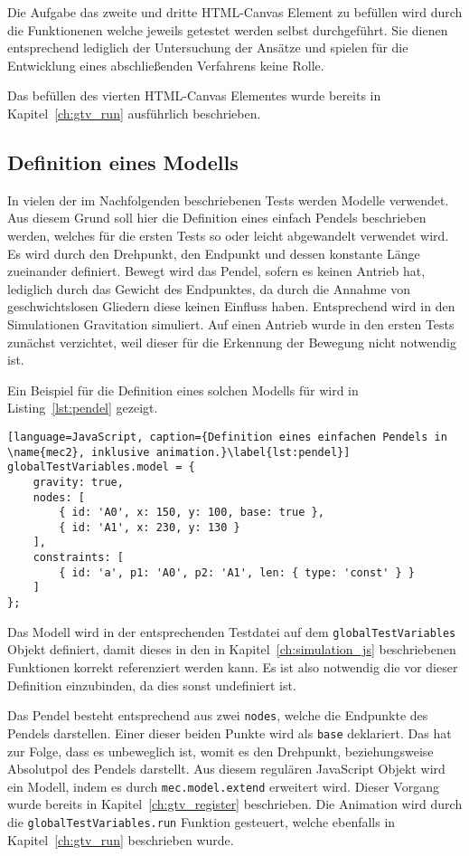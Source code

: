 Die Aufgabe das zweite und dritte HTML-Canvas Element zu befüllen wird durch die Funktionenen welche jeweils getestet werden selbst durchgeführt.
Sie dienen entsprechend lediglich der Untersuchung der Ansätze und spielen für die Entwicklung eines abschließenden Verfahrens keine Rolle.

Das befüllen des vierten HTML-Canvas Elementes wurde bereits in Kapitel~\ref{ch:gtv_run} ausführlich beschrieben.

\subsection{Definition eines  Modells}

In vielen der im Nachfolgenden beschriebenen Tests werden  Modelle verwendet.
Aus diesem Grund soll hier die Definition eines einfach Pendels beschrieben werden, welches für die ersten Tests so oder leicht abgewandelt verwendet wird.
Es wird durch den Drehpunkt, den Endpunkt und dessen konstante Länge zueinander definiert.
Bewegt wird das Pendel, sofern es keinen Antrieb hat, lediglich durch das Gewicht des Endpunktes, da durch die Annahme von geschwichtslosen Gliedern diese keinen Einfluss haben.
Entsprechend wird in den  Simulationen Gravitation simuliert.
Auf einen Antrieb wurde in den ersten Tests zunächst verzichtet, weil dieser für die Erkennung der Bewegung nicht notwendig ist.

Ein Beispiel für die Definition eines solchen Modells für  wird in Listing~\ref{lst:pendel} gezeigt.

\begin{lstlisting}[language=JavaScript, caption={Definition eines einfachen Pendels in \name{mec2}, inklusive animation.}\label{lst:pendel}]
globalTestVariables.model = {
    gravity: true,
    nodes: [
        { id: 'A0', x: 150, y: 100, base: true },
        { id: 'A1', x: 230, y: 130 }
    ],
    constraints: [
        { id: 'a', p1: 'A0', p2: 'A1', len: { type: 'const' } }
    ]
};
\end{lstlisting}

Das  Modell wird in der entsprechenden Testdatei  auf dem \lstinline{globalTestVariables} Objekt definiert, damit dieses in den in Kapitel~\ref{ch:simulation_js} beschriebenen Funktionen korrekt referenziert werden kann.
Es ist also notwendig die  vor dieser Definition einzubinden, da dies sonst undefiniert ist.

Das Pendel besteht entsprechend aus zwei \lstinline{nodes}, welche die Endpunkte des Pendels darstellen.
Einer dieser beiden Punkte wird als \lstinline{base} deklariert.
Das hat zur Folge, dass es unbeweglich ist, womit es den Drehpunkt, beziehungsweise Absolutpol des Pendels darstellt.
Aus diesem regulären JavaScript Objekt wird ein  Modell, indem es durch \lstinline{mec.model.extend} erweitert wird.
Dieser Vorgang wurde bereits in Kapitel~\ref{ch:gtv_register} beschrieben.
Die Animation wird durch die \lstinline{globalTestVariables.run} Funktion gesteuert, welche ebenfalls in Kapitel~\ref{ch:gtv_run} beschrieben wurde.

